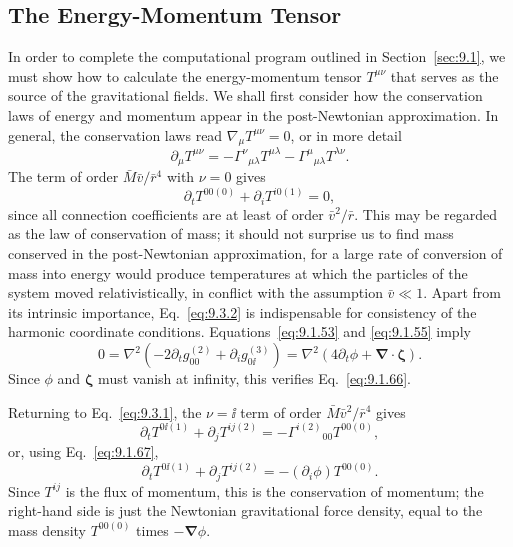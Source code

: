 
\subsection{The Energy-Momentum Tensor}\label{sec:9.3}

In order to complete the computational program outlined in
Section~\ref{sec:9.1}, we must show how to calculate the
energy-momentum tensor \(T^{\mu\nu}\) that serves as the source of the
gravitational fields. We shall first consider how the conservation laws of
energy and momentum appear in the post-Newtonian approximation. In general,
the conservation laws read \(\nabla_\mu T^{\mu\nu}=0\), or in more detail
\begin{equation}
  \partial_\mu T^{\mu\nu}
  =
  -\Gamma^\nu{}_{\mu\lambda}T^{\mu\lambda}
  -\Gamma^\mu{}_{\mu\lambda}T^{\lambda\nu}.
  \tag{9.3.1}\label{eq:9.3.1}
\end{equation}
The term of order \(\bar M\bar v/\bar r^4\) with \(\nu=0\) gives
\begin{equation}
  \partial_t T^{00(0)}+\partial_iT^{i0(1)}=0,
  \tag{9.3.2}\label{eq:9.3.2}
\end{equation}
since all connection coefficients are at least of order
\(\bar v^2/\bar r\). This may be regarded as the law of conservation of
mass; it should not surprise us to find mass conserved in the
post-Newtonian approximation, for a large rate of conversion of mass into
energy would produce temperatures at which the particles of the system
moved relativistically, in conflict with the assumption
\(\bar v\ll1\). Apart from its intrinsic importance,
Eq.~\eqref{eq:9.3.2} is indispensable for consistency of the harmonic
coordinate conditions. Equations~\eqref{eq:9.1.53} and
\eqref{eq:9.1.55} imply
\[
  0
  =
  \nabla^2\left(
    -2\partial_tg_{00}^{(2)}+\partial_i g_{0\ii}^{(3)}
  \right)
  =
  \nabla^2\left(
    4\partial_t\phi+\boldsymbol\nabla\cdot\boldsymbol\zeta
  \right).
\]
Since \(\phi\) and \(\boldsymbol\zeta\) must vanish at infinity, this
verifies Eq.~\eqref{eq:9.1.66}.

Returning to Eq.~\eqref{eq:9.3.1}, the \(\nu=\ii\) term of order
\(\bar M\bar v^2/\bar r^4\) gives
\[
  \partial_tT^{0\ii(1)}+\partial_jT^{ij(2)}
  =-\Gamma^{i(2)}{}_{00}T^{00(0)},
\]
or, using Eq.~\eqref{eq:9.1.67},
\begin{equation}
  \partial_tT^{0\ii(1)}+\partial_jT^{ij(2)}
  =
  -(\partial_i\phi)T^{00(0)}.
  \tag{9.3.3}\label{eq:9.3.3}
\end{equation}
Since \(T^{ij}\) is the flux of momentum, this is the conservation of
momentum; the right-hand side is just the Newtonian gravitational force
density, equal to the mass density \(T^{00(0)}\) times
\(-\boldsymbol\nabla\phi\).

